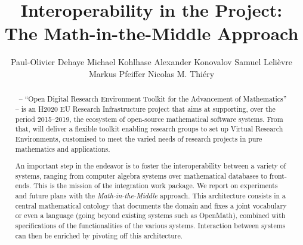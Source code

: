 \documentclass{llncs}
\title{Interoperability in the \ODK Project:\\
The Math-in-the-Middle Approach}
\author{Paul-Olivier Dehaye\inst{1} Michael Kohlhase\inst{2} Alexander
  Konovalov\inst{3} Samuel Lelièvre\inst{4} Markus
  Pfeiffer\inst{3} Nicolas M. Thiéry\inst{4}}
\institute{
  University of Z\"urich \and 
  Jacobs University \and 
  University of St~Andrews \and
  Universit\'e Paris-Sud
}
\begin{document}
\maketitle
\begin{abstract}
  \ODK\, -- ``Open Digital Research Environment Toolkit for the Advancement of
  Mathematics'' -- is an H2020 EU Research Infrastructure project that aims at supporting,
  over the period 2015--2019, the ecosystem of open-source mathematical software
  systems. From that, \ODK will deliver a flexible toolkit enabling research groups to set
  up Virtual Research Environments, customised to meet the varied needs of research
  projects in pure mathematics and applications.

  An important step in the \ODK endeavor is to foster the interoperability between a
  variety of systems, ranging from computer algebra systems over mathematical databases to
  front-ends. This is the mission of the integration work package. We report on
  experiments and future plans with the \emph{Math-in-the-Middle} approach. This
  architecture consists in a central mathematical ontology that documents the domain and
  fixes a joint vocabulary or even a language (going beyond existing systems such as
  OpenMath), combined with specifications of the functionalities of the various
  systems. Interaction between systems can then be enriched by pivoting off this
  architecture.
\end{abstract}








\printbibliography
\end{document}
